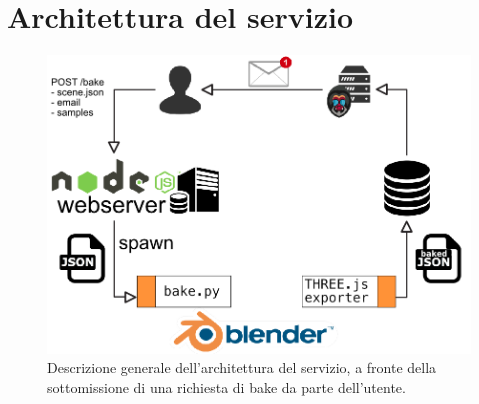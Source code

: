 \section{Architettura del servizio}
\label{sec:chapter_baking_service_architettura_servizio}

\begin{figure}[htb]
 \centering
 \includegraphics[width=1\linewidth]{images/chapter_baking_service/architettura.png}\hfill
 \caption[Architettura servizio di baking]{Descrizione generale dell'architettura del servizio, a fronte della sottomissione di una richiesta di bake da parte dell'utente.}
 \label{fig:architettura}
\end{figure}

